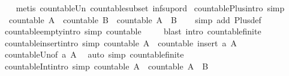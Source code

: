 \begin{isabellebody}
%
\isadelimproof
\ \ %
\endisadelimproof
%
\isatagproof
{}\isamarkupfalse%
\ {\isacharparenleft}metis\ countable{\isacharunderscore}Un\ countable{\isacharunderscore}subset\ inf{\isacharunderscore}sup{\isacharunderscore}ord{\isacharparenleft}{}{\isacharcomma}{}{\isacharparenright}{\isacharparenright}%
\endisatagproof
{\isafoldproof}%
%
\isadelimproof
\isanewline
%
\endisadelimproof
\isanewline
{}\isamarkupfalse%
\ countable{\isacharunderscore}Plus{\isacharbrackleft}intro{\isacharcomma}\ simp{\isacharbrackright}{\isacharcolon}\isanewline
\ \ {\isachardoublequoteopen}countable\ A\ {\isasymLongrightarrow}\ countable\ B\ {\isasymLongrightarrow}\ countable\ {\isacharparenleft}A\ {\isacharless}{\isacharplus}{\isachargreater}\ B{\isacharparenright}{\isachardoublequoteclose}\isanewline
%
\isadelimproof
\ \ %
\endisadelimproof
%
\isatagproof
{}\isamarkupfalse%
\ {\isacharparenleft}simp\ add{\isacharcolon}\ Plus{\isacharunderscore}def{\isacharparenright}%
\endisatagproof
{\isafoldproof}%
%
\isadelimproof
\isanewline
%
\endisadelimproof
\isanewline
{}\isamarkupfalse%
\ countable{\isacharunderscore}empty{\isacharbrackleft}intro{\isacharcomma}\ simp{\isacharbrackright}{\isacharcolon}\ {\isachardoublequoteopen}countable\ {\isacharbraceleft}{\isacharbraceright}{\isachardoublequoteclose}\isanewline
%
\isadelimproof
\ \ %
\endisadelimproof
%
\isatagproof
{}\isamarkupfalse%
\ {\isacharparenleft}blast\ intro{\isacharcolon}\ countable{\isacharunderscore}finite{\isacharparenright}%
\endisatagproof
{\isafoldproof}%
%
\isadelimproof
\isanewline
%
\endisadelimproof
\isanewline
{}\isamarkupfalse%
\ countable{\isacharunderscore}insert{\isacharbrackleft}intro{\isacharcomma}\ simp{\isacharbrackright}{\isacharcolon}\ {\isachardoublequoteopen}countable\ A\ {\isasymLongrightarrow}\ countable\ {\isacharparenleft}insert\ a\ A{\isacharparenright}{\isachardoublequoteclose}\isanewline
%
\isadelimproof
\ \ %
\endisadelimproof
%
\isatagproof
{}\isamarkupfalse%
\ countable{\isacharunderscore}Un{\isacharbrackleft}of\ {\isachardoublequoteopen}{\isacharbraceleft}a{\isacharbraceright}{\isachardoublequoteclose}\ A{\isacharbrackright}\ \isamarkupfalse%
\ {\isacharparenleft}auto\ simp{\isacharcolon}\ countable{\isacharunderscore}finite{\isacharparenright}%
\endisatagproof
{\isafoldproof}%
%
\isadelimproof
\isanewline
%
\endisadelimproof
\isanewline
{}\isamarkupfalse%
\ countable{\isacharunderscore}Int{}{\isacharbrackleft}intro{\isacharcomma}\ simp{\isacharbrackright}{\isacharcolon}\ {\isachardoublequoteopen}countable\ A\ {\isasymLongrightarrow}\ countable\ {\isacharparenleft}A\ {\isasyminter}\ B{\isacharparenright}{\isachardoublequoteclose}\isanewline

\end{isabellebody}
